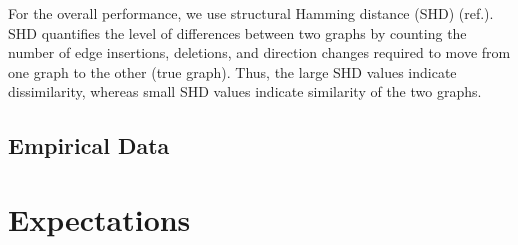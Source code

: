 \documentclass[11pt]{article}
\theoremstyle{definition}
\begin{document}

For the overall performance, we use structural Hamming distance (SHD) (ref.). SHD quantifies the level of differences between two graphs by counting the number of edge insertions, deletions, and direction changes required to move from one graph to the other (true graph). Thus, the large SHD values indicate dissimilarity, whereas small SHD values indicate similarity of the two graphs.



\subsection{Empirical Data}

\section{Expectations}






    
    






 

%
%




\pagebreak
\end{document}
